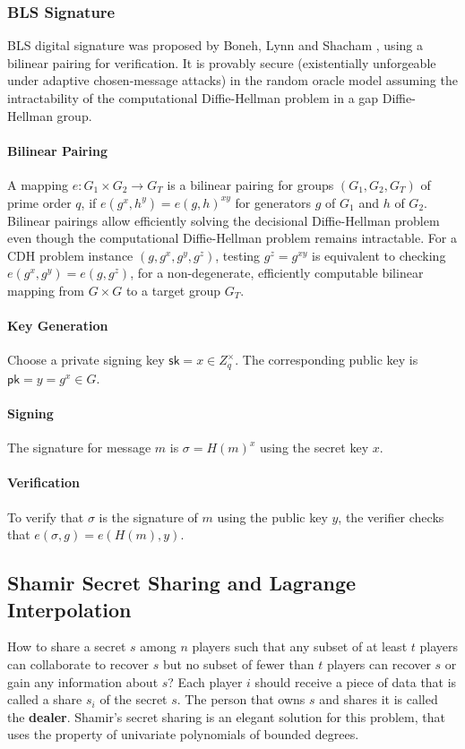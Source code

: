 \subsubsection{BLS Signature}
BLS digital signature was proposed by Boneh, Lynn and Shacham \cite{DBLP:journals/joc/BonehLS04}, using a bilinear pairing for verification. It is provably secure (existentially unforgeable under adaptive chosen-message attacks) in the random oracle model assuming the intractability of the computational Diffie-Hellman problem in a gap Diffie-Hellman group. 

\paragraph{Bilinear Pairing} A mapping $e: G_1\times G_2\to G_T$ is a bilinear pairing for groups $(G_1, G_2, G_T)$ of prime order $q$, if $e(g^x, h^y) = e(g, h)^{xy}$ for generators $g$ of $G_1$ and $h$ of $G_2$. Bilinear pairings allow efficiently solving the decisional Diffie-Hellman problem even though the computational Diffie-Hellman problem remains intractable. For a CDH problem instance $(g, g^x, g^y, g^z)$, testing $g^z=g^{xy}$ is equivalent to checking $e(g^x, g^y) = e(g, g^z)$, for a non-degenerate, efficiently computable bilinear mapping from $G\times G$ to a target group $G_T$. 

\paragraph{Key Generation} Choose a private signing key $\mathsf{sk}=x\in Z_q^\times$. The corresponding public key is $\mathsf{pk}=y=g^x \in G$. 

\paragraph{Signing} The signature for message $m$ is $\sigma=H(m)^x$ using the secret key $x$.  
\paragraph{Verification} To verify that $\sigma$ is the signature of $m$ using the public key $y$, the verifier checks that $e(\sigma, g) = e(H(m), y)$. 


\subsection{Shamir Secret Sharing and Lagrange Interpolation}
How to share a secret $s$ among $n$ players such that any subset of at least $t$ players can collaborate to recover $s$ but no subset of fewer than $t$ players can recover $s$ or gain any information about $s$? Each player $i$ should receive a piece of data that is called a share $s_i$ of the secret $s$. The person that owns $s$ and shares it is called the \textbf{dealer}. Shamir's secret sharing is an elegant solution for this problem, that uses the property of univariate polynomials of bounded degrees. 

